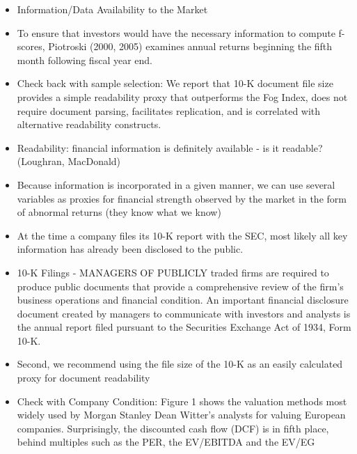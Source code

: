\documentclass[12pt]{article}
\begin{document}
    \begin{itemize}

        \item Information/Data Availability to the Market
        
        \item To ensure that investors would have the necessary information to compute f-scores, Piotroski (2000, 2005) examines annual returns beginning the fifth month following fiscal year end. \citep{Choi2012}
        
        \item Check back with sample selection: We report that 10-K document file size provides a simple readability proxy that outperforms the Fog Index, does not require document parsing, facilitates replication, and is correlated with alternative readability constructs.\citep{Loughran2014}

        \item Readability: financial information is definitely available - is it readable? (Loughran, MacDonald)
        
        \item Because information is incorporated in a given manner, we can use several variables as proxies for financial strength observed by the market in the form of abnormal returns (they know what we know)
        
        \item At the time a company files its 10-K report with the SEC, most likely all key information has already been disclosed to the public.\citep{You2009}
        
        \item 10-K Filings - MANAGERS OF PUBLICLY traded firms are required to produce public documents that provide a comprehensive review of the firm’s business operations and financial condition. An important financial disclosure document created by managers to communicate with investors and analysts is the annual report filed pursuant to the Securities Exchange Act of 1934, Form 10-K.\citep{Loughran2014}

        \item Second, we recommend using the file size of the 10-K as an easily calculated proxy for document readability \citep{Loughran2014}

        \item Check with Company Condition: Figure 1 shows the valuation methods most widely used by Morgan Stanley Dean Witter’s analysts for valuing European companies. Surprisingly, the discounted cash flow (DCF) is in fifth place, behind multiples such as the PER, the EV/EBITDA and the EV/EG \citep{Fernandez2001}
        
    \end{itemize}
\end{document}
